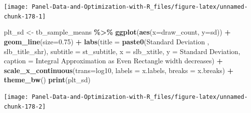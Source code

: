 \documentclass[
]{book}
\newenvironment{Shaded}{\begin{snugshade}}{\end{snugshade}}
\newcommand{\DataTypeTok}[1]{\textcolor[rgb]{0.13,0.29,0.53}{#1}}
\newcommand{\FloatTok}[1]{\textcolor[rgb]{0.00,0.00,0.81}{#1}}
\newcommand{\KeywordTok}[1]{\textcolor[rgb]{0.13,0.29,0.53}{\textbf{#1}}}
\newcommand{\NormalTok}[1]{#1}
\newcommand{\OperatorTok}[1]{\textcolor[rgb]{0.81,0.36,0.00}{\textbf{#1}}}
\newcommand{\StringTok}[1]{\textcolor[rgb]{0.31,0.60,0.02}{#1}}
\begin{document}
\begin{center}\texttt{[image: Panel-Data-and-Optimization-with-R\_files/figure-latex/unnamed-chunk-178-1]} \end{center}

\begin{Shaded}
\begin{Highlighting}[]
\NormalTok{plt\_sd \textless{}{-}}\StringTok{ }\NormalTok{tb\_sample\_means }\OperatorTok{\%\textgreater{}\%}
\StringTok{  }\KeywordTok{ggplot}\NormalTok{(}\KeywordTok{aes}\NormalTok{(}\DataTypeTok{x=}\NormalTok{draw\_count, }\DataTypeTok{y=}\NormalTok{sd)) }\OperatorTok{+}
\StringTok{  }\KeywordTok{geom\_line}\NormalTok{(}\DataTypeTok{size=}\FloatTok{0.75}\NormalTok{) }\OperatorTok{+}
\StringTok{  }\KeywordTok{labs}\NormalTok{(}\DataTypeTok{title =} \KeywordTok{paste0}\NormalTok{(}\StringTok{\textquotesingle{}Standard Deviation \textquotesingle{}}\NormalTok{, slb\_title\_shr),}
       \DataTypeTok{subtitle =}\NormalTok{ st\_subtitle,}
       \DataTypeTok{x =}\NormalTok{ slb\_xtitle,}
       \DataTypeTok{y =} \StringTok{\textquotesingle{}Standard Deviation\textquotesingle{}}\NormalTok{,}
       \DataTypeTok{caption =} \StringTok{\textquotesingle{}Integral Approximation as Even Rectangle width decreases\textquotesingle{}}\NormalTok{) }\OperatorTok{+}
\StringTok{  }\KeywordTok{scale\_x\_continuous}\NormalTok{(}\DataTypeTok{trans=}\StringTok{\textquotesingle{}log10\textquotesingle{}}\NormalTok{, }\DataTypeTok{labels =}\NormalTok{ x.labels, }\DataTypeTok{breaks =}\NormalTok{ x.breaks) }\OperatorTok{+}
\StringTok{  }\KeywordTok{theme\_bw}\NormalTok{()}
\KeywordTok{print}\NormalTok{(plt\_sd)}
\end{Highlighting}
\end{Shaded}

\begin{center}\texttt{[image: Panel-Data-and-Optimization-with-R\_files/figure-latex/unnamed-chunk-178-2]} \end{center}
\end{document}
